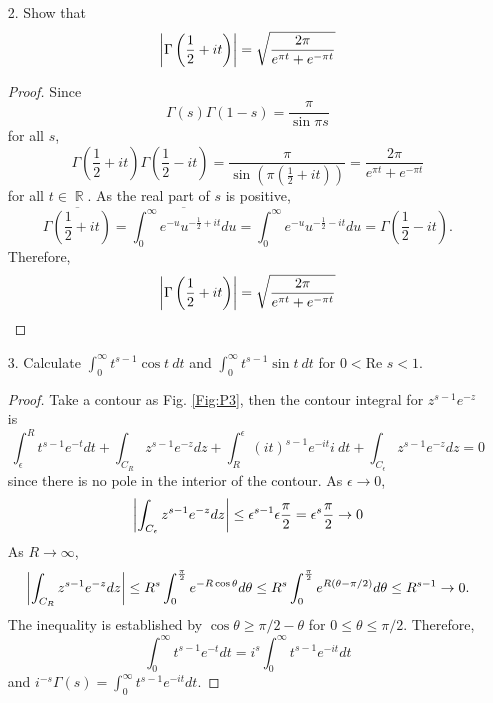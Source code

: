 \documentclass{article}
\DeclareMathOperator{\rr}{\mathbb{R}}
\begin{document}
\begin{enumerate}
\item[2.] Show that
\begin{equation*}
\abs{\Gamma\left(\frac{1}{2}+it\right)}=\sqrt{\frac{2\pi}{e^{\pi t}+e^{-\pi t}}}
\end{equation*}
\begin{proof}
Since
\begin{equation*}
\Gamma(s)\Gamma(1-s)=\frac{\pi}{\sin\pi s}
\end{equation*}
for all $s$,
\begin{equation*}
\Gamma\left(\frac{1}{2}+it\right)\Gamma\left(\frac{1}{2}-it\right)=\frac{\pi}{\sin\left(\pi(\frac{1}{2}+it)\right)}=\frac{2\pi}{e^{\pi t}+e^{-\pi t}}
\end{equation*}
for all $t\in \rr$. As the real part of $s$ is positive,
\begin{equation*}
\overline{\Gamma\left(\frac{1}{2}+it\right)}=\overline{\int_0^\infty e^{-u}u^{-\frac{1}{2}+it}du}=\int_0^\infty e^{-u}u^{-\frac{1}{2}-it}du=\Gamma\left(\frac{1}{2}-it\right).
\end{equation*}
Therefore,
\begin{equation*}
\abs{\Gamma\left(\frac{1}{2}+it\right)}=\sqrt{\frac{2\pi}{e^{\pi t}+e^{-\pi t}}}
\end{equation*}
\end{proof}

\item[3.] Calculate $\int_0^\infty t^{s-1}\cos t~dt $ and $\int_0^\infty t^{s-1}\sin t~dt$ for $0<\text{Re } s<1$.
\begin{proof}
Take a contour as Fig. \ref{Fig:P3}, then the contour integral for $z^{s-1}e^{-z}$ is
\begin{equation*}
\int_\epsilon^R t^{s-1}e^{-t} dt+\int_{C_R}z^{s-1}e^{-z} dz+\int_R^\epsilon (it)^{s-1} e^{-it} i~dt+\int_{C_\epsilon}z^{s-1}e^{-z} dz=0
\end{equation*}
since there is no pole in the interior of the contour. As $\epsilon\rightarrow 0$,
\begin{equation*}
\abs{\int_{C_\epsilon}z^{s-1}e^{-z} dz}\leq \epsilon^{s-1}\epsilon\frac{\pi}{2}=\epsilon^s \frac{\pi}{2}\rightarrow 0
\end{equation*}
As $R\rightarrow \infty$,
\begin{equation*}
\abs{\int_{C_R}z^{s-1}e^{-z} dz}\leq R^s \int_0^{\frac{\pi}{2}} e^{-R\cos\theta}d\theta\leq R^s \int_0^{\frac{\pi}{2}} e^{R(\theta-\pi/2)}d\theta\leq R^{s-1}\rightarrow 0.
\end{equation*}
The inequality is established by $\cos\theta\geq\pi/2-\theta$ for $0\leq\theta\leq\pi/2$.
Therefore,
\begin{equation*}
\int_0^\infty t^{s-1}e^{-t}dt=i^s\int_0^\infty t^{s-1}e^{-it}dt 
\end{equation*}
and $i^{-s}\Gamma(s)=\int_0^\infty t^{s-1}e^{-it}dt$.


\end{proof}
\end{enumerate}
\end{document}
